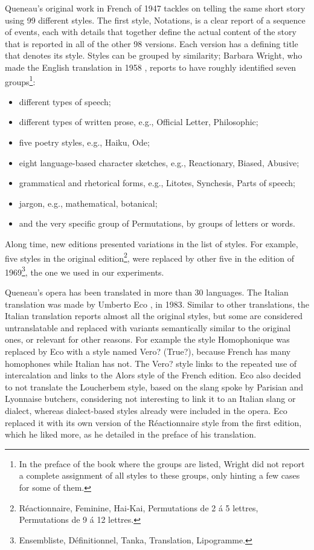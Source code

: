 \documentclass[
twocolumn,
]{ceurart}
\begin{document}
Queneau's original work in French of 1947 \cite{queneau1947exercises} tackles on telling the same short story using 99 different styles.
The first style, Notations, is a clear report of a sequence of events, each with details that together define the actual content of the story that is reported in all of the other 98 versions.
Each version has a defining title that denotes its style.
Styles can be grouped by similarity; Barbara Wright, who made the English translation in 1958  \cite{queneau1958exercises}, reports to have roughly identified seven groups\footnote{In the preface of the book where the groups are listed, Wright did not report a complete assignment of all styles to these groups, only hinting a few cases for some of them.}:
\begin{itemize}
    \item different types of speech;
    \item different types of written prose, e.g.,  Official Letter, Philosophic;
    \item five poetry styles, e.g., Haiku, Ode;
    \item eight language-based character sketches, e.g., Reactionary, Biased, Abusive;
    \item grammatical and rhetorical forms, e.g., Litotes, Synchesis, Parts of speech;
    \item jargon, e.g., mathematical, botanical;
    \item and the very specific group of Permutations, by groups of letters or words.
\end{itemize}
Along time, new editions presented variations in the list of styles. 
For example, five styles in the original edition\footnote{R\'eactionnaire, Feminine, Hai-Kai, Permutations de 2 \'a 5 lettres, Permutations de 9 \'a 12 lettres.}, were replaced by other five in the edition of 1969\footnote{Ensembliste, D\'efinitionnel, Tanka, Translation, Lipogramme.}, the one we used in our experiments. 

Queneau's opera has been translated in more than 30 languages.
The Italian translation was made by Umberto Eco \cite{queneau1983esercizi}, in 1983.
Similar to other translations, the Italian translation reports almost all the original styles, but some are considered untranslatable and replaced with variants semantically similar to the original ones, or relevant for other reasons.
For example the style Homophonique was replaced by Eco with a style named Vero? (True?), because French has many homophones while Italian has not. 
The Vero? style links to the repeated use of intercalation and links to the Alors style of the French edition.
Eco also decided to not translate the Loucherbem style, based on the slang spoke by Parisian and Lyonnaise butchers, considering not interesting to link it to an Italian slang or dialect, whereas dialect-based styles already were included in the opera.
Eco replaced it with its own version of the R\'eactionnaire style from the first edition, which he liked more, as he detailed in the preface of his translation.
\end{document}
